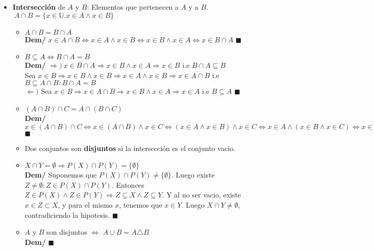 \documentclass[11pt,a4paper]{article}
\newcommand*{\QEDA}{\null\nobreak\hfill\ensuremath{\blacksquare}}
\begin{document}
\begin{itemize}
\item \textbf{Intersecci\'on} de $A$ y $B$: Elementos que pertenecen a $A$ y a $B$. $\ A \cap B = \{x\in \mathbb{U} . x\in A \land x\in B\}$
\begin{itemize}
\item $A \cap B = B \cap A$\\
\indent \textbf{Dem/} $x \in A \cap B \iff x \in A \land x \in B \iff x \in B \land x \in A \iff x \in B \cap A$ \QEDA
\item $B \subseteq A \iff B \cap A = B$\\
\indent \textbf{Dem/} $\Rightarrow)\ x \in B \cap A \Rightarrow x \in B \land x \in A \Rightarrow x \in B$ i.e $B\cap A \subseteq B$ \\
Sea $x \in B \Rightarrow x \in B \land x \in B \Rightarrow x \in A \land x \in B \Rightarrow x \in A\cap B$ i.e $B \subseteq A\cap B \therefore B \cap A = B$\\
$\Leftarrow) $ Sea $x \in B \Rightarrow x \in A \cap B \Rightarrow x \in B \land x \in A \Rightarrow x \in A$ i.e $B \subseteq A$ \QEDA
\item $(A \cap B) \cap C = A \cap (B \cap C)$\\
\indent \textbf{Dem/} $x \in (A \cap B) \cap C \iff x \in (A \cap B) \land x \in C \iff (x \in A \land x \in B) \land x \in C \iff x \in A \land (x \in B \land x \in C) \iff x \in A \land x \in (B \cap C) \iff x \in A \cap (B \cap C)$ \QEDA
\item Dos conjuntos son \textbf{disjuntos} si la intersecci\'on es el conjunto vacio.
\item $X \cap Y = \emptyset \Rightarrow P(X) \cap P(Y) = \{\emptyset\}$\\
\textbf{Dem/} Suponemos que $P(X) \cap P(Y) \not = \{\emptyset\}$. Luego existe $Z \not = \emptyset : Z \in P(X) \cap P(Y)$. Entonces $Z \in P(X) \land Z \in P(Y) \Rightarrow Z \subseteq X \land Z \subseteq Y$. Y al no ser vacio, existe $x \in Z \subset X$, y para el mismo $x$, tenemos que $x \in Y$. Luego $X \cap Y \not = \emptyset$, contradiciendo la hipotesis. \QEDA
\item $A$ y $B$ son disjuntos $\iff$ $A \cup B = A \triangle B$\\
\textbf{Dem/} \QEDA

\end{itemize}


\end{itemize}
\end{document}
